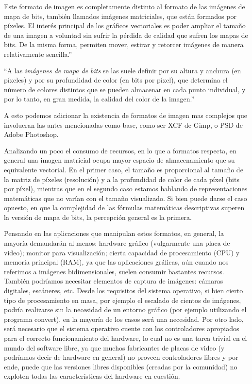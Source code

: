 \documentclass[12pt]{article}
\begin{document}
Este formato de imagen es completamente distinto al formato de las imágenes de mapa de bits, también 
llamados imágenes matriciales, que están formados por píxeles. El interés principal de los gráficos 
vectoriales es poder ampliar el tamaño de una imagen a voluntad sin sufrir la pérdida 
de calidad que sufren los mapas de bits. De la misma forma, permiten mover, estirar y 
retorcer imágenes de manera relativamente sencilla.'' \cite{wikiives}

``A las {\it imágenes de mapa de bits} se las suele definir por su altura y anchura (en píxeles) y por 
su profundidad de color (en bits por píxel), que determina el número de colores distintos que se 
pueden almacenar en cada punto individual, y por lo tanto, en gran medida, la calidad del color de la imagen.''
\cite{wikiimes}

A esto podemos adicionar la existencia de formatos de imagen mas complejos que involucran las antes mencionadas
como base, como ser XCF de Gimp, o PSD de Adobe Photoshop. 

Analizando un poco el consumo de recursos, en lo que a formatos respecta, en general una 
imagen matricial ocupa mayor espacio de almacenamiento que su equivalente vectorial. En el 
primer caso, el tamaño es proporcional al tamaño de la matriz de píxeles (resolución) y a la
profundidad de color de cada píxel (bits por píxel), mientras que en el segundo caso estamos 
hablando de representaciones matemáticas que no varían con el tamaño visualizado. Si bien puede 
darse el caso opuesto, en que la complejidad de las fórmulas matemáticas descriptivas superen 
la versión de mapa de bits, la percepción general es la primera. 

Pensando en las aplicaciones que manipulan estos formatos, en general, la mayoría demandarán al 
menos: hardware gráfico (vulgarmente una placa de video); 
monitor para visualización; cierta capacidad de procesamiento (CPU) y memoria principal (RAM), ya que 
las aplicaciones gráficas, aún cuando nos referimos a imágenes bidimensionales, suelen consumir bastantes 
recursos. También podríamos necesitar elementos de captura de imágenes: cámaras digitales, escáneres, etc.  
Desde los requisitos del sistema operativo, si bien cierto tipo de procesamiento en masa,
por ejemplo el escalado de cientos de imágenes, podría realizarse sin la necesidad de un
entorno gráfico (por ejemplo utilizando el programa convert), en la mayoría de los casos será una 
necesidad. Por otro lado, será necesario que el sistema operativo cuente con los controladores
apropiados para el correcto funcionamiento del hardware, lo cual no es una tarea trivial en 
el mundo del software libre, ya que muchos fabricantes de placas de video (y podríamos decir de hardware
en general) no proveen controladores libres y por ende, puede que las versiones libres 
disponibles (creadas por la comunidad) no exploten todas las características del hardware en cuestión.  
\end{document}
